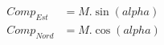 \begin{align*}
  Comp_{Est}  &=  M . \sin (alpha) \\
  Comp_{Nord} &=  M . \cos (alpha)
\end{align*}

